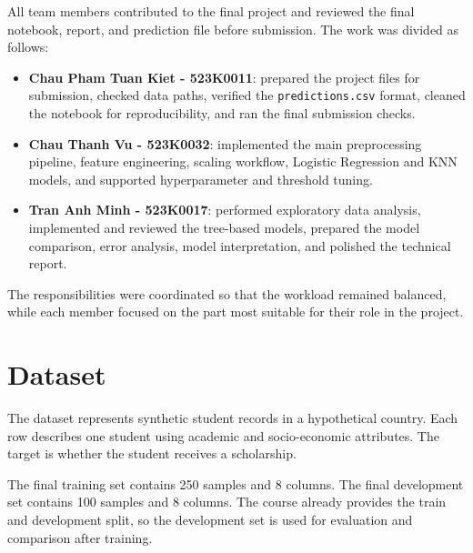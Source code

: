 ﻿\documentclass[12pt,a4paper]{article}
\begin{document}
All team members contributed to the final project and reviewed the final notebook, report, and prediction file before submission. The work was divided as follows:

\begin{itemize}
    \item \textbf{Chau Pham Tuan Kiet - 523K0011}: prepared the project files for submission, checked data paths, verified the \texttt{predictions.csv} format, cleaned the notebook for reproducibility, and ran the final submission checks.
    \item \textbf{Chau Thanh Vu - 523K0032}: implemented the main preprocessing pipeline, feature engineering, scaling workflow, Logistic Regression and KNN models, and supported hyperparameter and threshold tuning.
    \item \textbf{Tran Anh Minh - 523K0017}: performed exploratory data analysis, implemented and reviewed the tree-based models, prepared the model comparison, error analysis, model interpretation, and polished the technical report.
\end{itemize}

The responsibilities were coordinated so that the workload remained balanced, while each member focused on the part most suitable for their role in the project.

\clearpage

\section{Dataset}

The dataset represents synthetic student records in a hypothetical country. Each row describes one student using academic and socio-economic attributes. The target is whether the student receives a scholarship.

The final training set contains 250 samples and 8 columns. The final development set contains 100 samples and 8 columns. The course already provides the train and development split, so the development set is used for evaluation and comparison after training.
\end{document}
